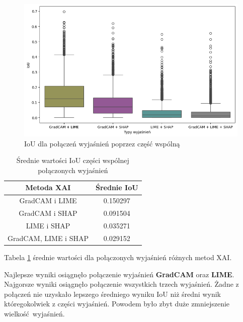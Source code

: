 \begin{figure}[h]
	\centering\includegraphics[width=.9\textwidth]{img/combine_iou_and}
	\caption{IoU dla połączeń wyjaśnień poprzez część wspólną}  \label{rys:combine_iou_and}
\end{figure}
\begin{table}[h]
	\centering
	\begin{tabular}{|c|c|}
		\hline
		\textbf{Metoda XAI}  & Średnie IoU \\
		\hline
		GradCAM i LIME       & 0.150297    \\
		\hline
		GradCAM i SHAP       & 0.091504    \\
		\hline
		LIME i SHAP          & 0.035271    \\
		\hline
		GradCAM, LIME i SHAP & 0.029152    \\
		\hline
	\end{tabular}
	\caption{Średnie wartości IoU części wspólnej połączonych wyjaśnień}
	\label{tab:combineandiouand}
\end{table}
Tabela \ref{tab:combineandiouand} średnie wartości dla połączonych wyjaśnień różnych metod XAI.

Najlepsze wyniki osiągnęło połączenie wyjaśnień \textbf{GradCAM} oraz \textbf{LIME}.
Najgorsze wyniki osiągnęło połączenie wszystkich trzech wyjaśnień.
Żadne z połączeń nie uzyskało lepszego średniego wyniku IoU niż średni wynik któregokolwiek z części wyjaśnień.
Powodem było zbyt duże zmniejszenie wielkość wyjaśnień.

\vspace{1cm}


